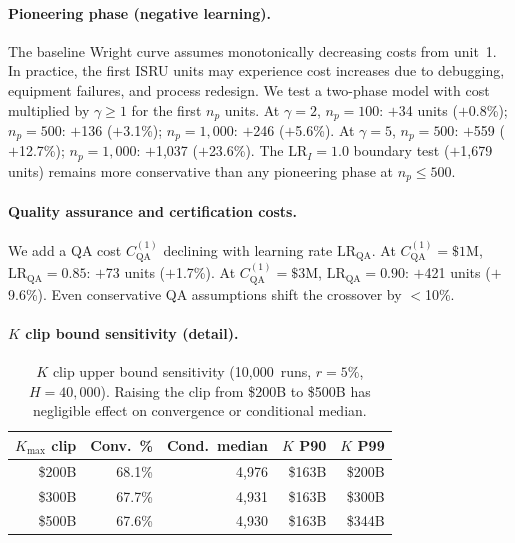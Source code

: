 \documentclass[preprint,12pt]{elsarticle}
\begin{document}
\paragraph{Pioneering phase (negative learning).} The baseline Wright curve assumes monotonically decreasing costs from unit~1. In practice, the first ISRU units may experience cost increases due to debugging, equipment failures, and process redesign. We test a two-phase model with cost multiplied by $\gamma \geq 1$ for the first $n_p$ units. At $\gamma = 2$, $n_p = 100$: $+$34 units ($+$0.8\%); $n_p = 500$: $+$136 ($+$3.1\%); $n_p = 1{,}000$: $+$246 ($+$5.6\%). At $\gamma = 5$, $n_p = 500$: $+$559 ($+$12.7\%); $n_p = 1{,}000$: $+$1{,}037 ($+$23.6\%). The $\mathrm{LR}_I = 1.0$ boundary test ($+$1{,}679 units) remains more conservative than any pioneering phase at $n_p \leq 500$.

\paragraph{Quality assurance and certification costs.} We add a QA cost $C_{\mathrm{QA}}^{(1)}$ declining with learning rate $\mathrm{LR}_{\mathrm{QA}}$. At $C_{\mathrm{QA}}^{(1)} = \$1$M, $\mathrm{LR}_{\mathrm{QA}} = 0.85$: $+$73 units ($+$1.7\%). At $C_{\mathrm{QA}}^{(1)} = \$3$M, $\mathrm{LR}_{\mathrm{QA}} = 0.90$: $+$421 units ($+$9.6\%). Even conservative QA assumptions shift the crossover by $<$10\%.

\paragraph{$K$ clip bound sensitivity (detail).}

\begin{table}[htbp]
\centering
\caption{$K$ clip upper bound sensitivity (10{,}000~runs, $r = 5\%$, $H = 40{,}000$). Raising the clip from \$200B to \$500B has negligible effect on convergence or conditional median.}
\label{tab:k_clip}
\small
\begin{tabular}{@{}rrrrr@{}}
\toprule
$K_{\max}$ clip & Conv.\ \% & Cond.\ median & $K$ P90 & $K$ P99 \\
\midrule
\$200B & 68.1\% & 4{,}976 & \$163B & \$200B \\
\$300B & 67.7\% & 4{,}931 & \$163B & \$300B \\
\$500B & 67.6\% & 4{,}930 & \$163B & \$344B \\
\bottomrule
\end{tabular}
\end{table}
\end{document}
